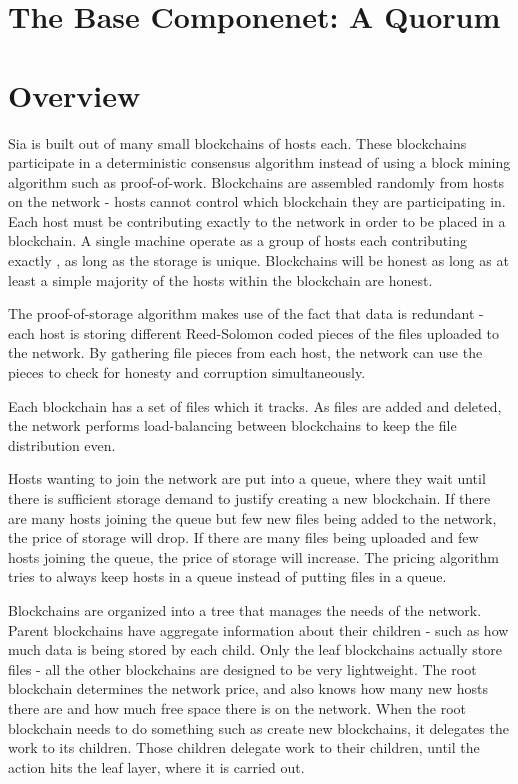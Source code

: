 \documentclass[twocolumn]{article}
\begin{document}

\section{The Base Componenet: A Quorum}

\section{Overview}

Sia is built out of many small blockchains of \numhosts{} hosts each.
These blockchains participate in a deterministic consensus algorithm instead of using a block mining algorithm such as proof-of-work.
Blockchains are assembled randomly from hosts on the network - hosts cannot control which blockchain they are participating in.
Each host must be contributing exactly \storageperhost{} to the network in order to be placed in a blockchain.
A single machine operate as a group of hosts each contributing exactly \storageperhost{}, as long as the storage is unique.
Blockchains will be honest as long as at least a simple majority of the hosts within the blockchain are honest.

The proof-of-storage algorithm makes use of the fact that data is redundant - each host is storing different Reed-Solomon coded pieces of the files uploaded to the network.
By gathering file pieces from each host, the network can use the pieces to check for honesty and corruption simultaneously.

Each blockchain has a set of files which it tracks.
As files are added and deleted, the network performs load-balancing between blockchains to keep the file distribution even.

Hosts wanting to join the network are put into a queue, where they wait until there is sufficient storage demand to justify creating a new blockchain.
If there are many hosts joining the queue but few new files being added to the network, the price of storage will drop.
If there are many files being uploaded and few hosts joining the queue, the price of storage will increase.
The pricing algorithm tries to always keep hosts in a queue instead of putting files in a queue.

Blockchains are organized into a tree that manages the needs of the network.
Parent blockchains have aggregate information about their children - such as how much data is being stored by each child.
Only the leaf blockchains actually store files - all the other blockchains are designed to be very lightweight.
The root blockchain determines the network price, and also knows how many new hosts there are and how much free space there is on the network.
When the root blockchain needs to do something such as create new blockchains, it delegates the work to its children.
Those children delegate work to their children, until the action hits the leaf layer, where it is carried out.
\end{document}
